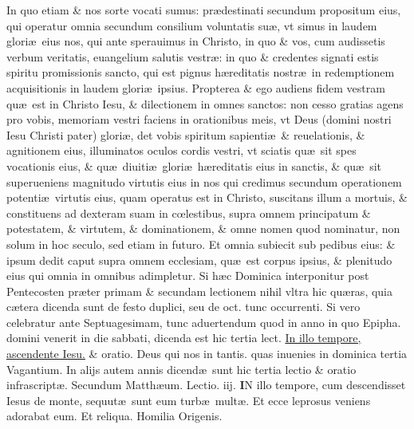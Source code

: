 \documentclass[a5paper,10pt]{book}
\def\rightmarginnote{%
	\lrmarginnote{\hskip\columnwidth \hskip -1em}}
\def\ae{æ}
\def\oe{œ}
\begin{document}
\begin{multicols*}{2}
In quo etiam \& nos sorte vocati sumus: pr\ae destinati secundum propositum eius, qui operatur omnia secundum consilium voluntatis su\ae , vt simus in laudem glori\ae \ eius nos, qui ante sperauimus in Christo, in quo \& vos, cum audissetis verbum veritatis, euangelium salutis vestr\ae : in quo \& credentes signati estis spiritu promissionis sancto, qui est pignus h\ae reditatis nostr\ae \ in redemptionem acquisitionis in laudem glori\ae \ ipsius.
Propterea \& ego audiens fidem vestram qu\ae \ est in Christo Iesu, \& dilectionem in omnes sanctos: non cesso
gratias agens pro vobis, memoriam vestri faciens in orationibus meis, vt Deus (domini nostri Iesu Christi pater) glori\ae , det vobis spiritum sapienti\ae \ \& reuelationis, \& agnitionem eius, illuminatos oculos cordis vestri, vt sciatis qu\ae \ sit spes vocationis eius, \& qu\ae \ diuiti\ae \ glori\ae \ h\ae reditatis eius in sanctis, \& qu\ae \ sit superueniens magnitudo virtutis eius in nos qui credimus secundum operationem potenti\ae \ virtutis eius, quam operatus est in Christo, suscitans illum a mortuis, \& constituens ad dexteram suam in c\oe lestibus, supra omnem principatum \& potestatem, \& virtutem, \& dominationem, \& omne nomen quod nominatur, non solum in hoc seculo, sed etiam in futuro.
Et omnia subiecit sub pedibus eius: \& ipsum dedit caput supra omnem ecclesiam, qu\ae \ est corpus ipsius, \& plenitudo eius qui omnia in omnibus adimpletur.
\newline {} \color{red} Si h\ae c Dominica interponitur post Pentecosten pr\ae ter primam \& secundam lectionem nihil vltra hic qu\ae ras, quia c\ae tera dicenda sunt de festo duplici, seu de oct. tunc occurrenti. Si vero celebratur ante Septuagesimam, tunc aduertendum quod in anno in quo Epipha. domini venerit in die sabbati, dicenda est hic tertia lect. \color{black} \hyperlink{page.181}{In illo tempore, ascendente Iesu.} \color{red} \& oratio. \color{black} Deus qui nos in tantis. \color{red} quas inuenies in dominica tertia Vagantium. In alijs autem annis dicend\ae \ sunt hic tertia lectio \& oratio infrascript\ae . \color{black}
\newline \color{red} Secundum Matth\ae um. \hfill Lectio. iij. \color{black}
\vspace{-.25em}
\lettrine[lines=2]{\bfseries \color{red} I}{}N\rightmarginnote{ca. 8.} illo tempore, cum descendisset Iesus de monte, sequut\ae \ sunt eum turb\ae \ mult\ae . Et ecce leprosus veniens adorabat eum.
\newline \color{red} Et reliqua. Homilia Origenis.\color{black}

\end{multicols*}
\end{document}
